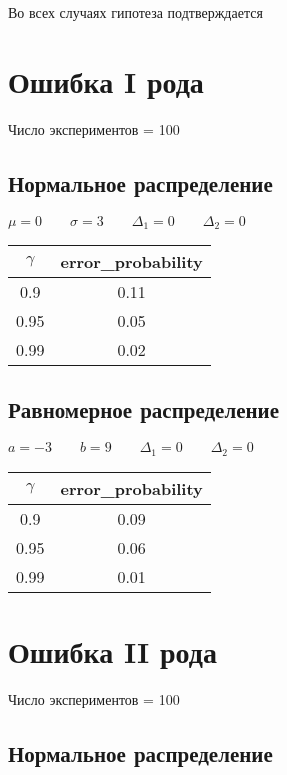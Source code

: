 \documentclass[12pt, a4paper]{article}
\begin{document}
Во всех случаях гипотеза подтверждается

\section{Ошибка I рода}

Число экспериментов = 100

\subsection{Нормальное распределение}

$\mu = 0 \qquad \sigma = 3 \qquad \Delta_1 = 0 \qquad \Delta_2 = 0$

\begin{center}
    \begin{tabular}{|c|c|}
         \hline $\gamma$ & error\_probability \\
         \hline 0.9 & 0.11 \\
         \hline 0.95 & 0.05 \\
         \hline 0.99 & 0.02 \\
         \hline
    \end{tabular}
\end{center}

\subsection{Равномерное распределение}

$a = -3 \qquad b = 9 \qquad \Delta_1 = 0 \qquad \Delta_2 = 0$

\begin{center}
    \begin{tabular}{|c|c|}
         \hline $\gamma$ & error\_probability \\
         \hline 0.9 & 0.09 \\
         \hline 0.95 & 0.06 \\
         \hline 0.99 & 0.01 \\
         \hline
    \end{tabular}
\end{center}

\section{Ошибка II рода}


Число экспериментов = 100

\subsection{Нормальное распределение}
\end{document}
